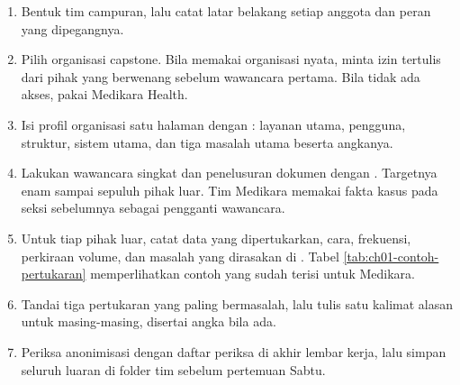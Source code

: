 \begin{enumerate}
  \item Bentuk tim campuran, lalu catat latar belakang setiap anggota dan peran
        yang dipegangnya.
  \item Pilih organisasi capstone. Bila memakai organisasi nyata, minta izin
        tertulis dari pihak yang berwenang sebelum wawancara pertama. Bila tidak
        ada akses, pakai Medikara Health.
  \item Isi profil organisasi satu halaman dengan
        : layanan utama, pengguna,
        struktur, sistem utama, dan tiga masalah utama beserta angkanya.
  \item Lakukan wawancara singkat dan penelusuran dokumen dengan
        . Targetnya enam
        sampai sepuluh pihak luar. Tim Medikara memakai fakta kasus pada seksi
        sebelumnya sebagai pengganti wawancara.
  \item Untuk tiap pihak luar, catat data yang dipertukarkan, cara, frekuensi,
        perkiraan volume, dan masalah yang dirasakan di
        . Tabel
        \ref{tab:ch01-contoh-pertukaran} memperlihatkan contoh yang sudah
        terisi untuk Medikara.
  \item Tandai tiga pertukaran yang paling bermasalah, lalu tulis satu kalimat
        alasan untuk masing-masing, disertai angka bila ada.
  \item Periksa anonimisasi dengan daftar periksa di akhir lembar kerja, lalu
        simpan seluruh luaran di folder tim sebelum pertemuan Sabtu.
\end{enumerate}


